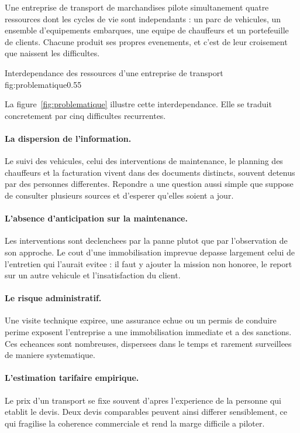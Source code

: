 Une entreprise de transport de marchandises pilote simultanement quatre
ressources dont les cycles de vie sont independants : un parc de
vehicules, un ensemble d'equipements embarques, une equipe de chauffeurs
et un portefeuille de clients. Chacune produit ses propres evenements,
et c'est de leur croisement que naissent les difficultes.

  {Interdependance des ressources d'une entreprise de transport}
  {fig:problematique}{0.55}

La figure~\ref{fig:problematique} illustre cette interdependance. Elle se
traduit concretement par cinq difficultes recurrentes.

\paragraph{La dispersion de l'information.}
Le suivi des vehicules, celui des interventions de maintenance, le
planning des chauffeurs et la facturation vivent dans des documents
distincts, souvent detenus par des personnes differentes. Repondre a une
question aussi simple que  suppose de consulter plusieurs sources et d'esperer qu'elles
soient a jour.

\paragraph{L'absence d'anticipation sur la maintenance.}
Les interventions sont declenchees par la panne plutot que par
l'observation de son approche. Le cout d'une immobilisation imprevue
depasse largement celui de l'entretien qui l'aurait evitee : il faut y
ajouter la mission non honoree, le report sur un autre vehicule et
l'insatisfaction du client.

\paragraph{Le risque administratif.}
Une visite technique expiree, une assurance echue ou un permis de
conduire perime exposent l'entreprise a une immobilisation immediate et a
des sanctions. Ces echeances sont nombreuses, dispersees dans le temps et
rarement surveillees de maniere systematique.

\paragraph{L'estimation tarifaire empirique.}
Le prix d'un transport se fixe souvent d'apres l'experience de la
personne qui etablit le devis. Deux devis comparables peuvent ainsi
differer sensiblement, ce qui fragilise la coherence commerciale et rend
la marge difficile a piloter.

